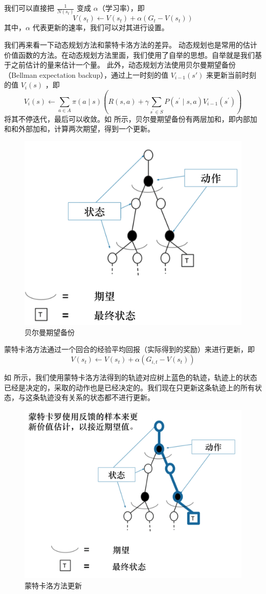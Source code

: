我们可以直接把 $\frac{1}{N(s_t)}$ 变成 $\alpha$（学习率），即
\begin{equation}
	V\left(s_{t}\right) \leftarrow V\left(s_{t}\right)+\alpha\left(G_{t}-V\left(s_{t}\right)\right)
\end{equation}
其中，$\alpha$ 代表更新的速率，我们可以对其进行设置。

我们再来看一下动态规划方法和蒙特卡洛方法的差异。
动态规划也是常用的估计价值函数的方法。在动态规划方法里面，我们使用了自举的思想。自举就是我们基于之前估计的量来估计一个量。
此外，动态规划方法使用贝尔曼期望备份（Bellman expectation backup），通过上一时刻的值 $V_{i-1}(s')$ 来更新当前时刻的值 $V_i(s)$ ，即
	\begin{equation}
		\label{eq:}
		V_{i}(s) \leftarrow \sum_{a \in A} \pi(a \mid s)\left(R(s, a)+\gamma \sum_{s^{\prime} \in S} P\left(s^{\prime} \mid s, a\right) V_{i-1}\left(s^{\prime}\right)\right)
	\end{equation}
将其不停迭代，最后可以收敛。如 所示，贝尔曼期望备份有两层加和，即内部加和和外部加和，计算两次期望，得到一个更新。
\begin{figure}[htb]
	\centering
	\includegraphics[width=0.3\linewidth]{res/ch3/MC_4}
	\caption{贝尔曼期望备份}
	\label{fig:MC_4}
\end{figure}


蒙特卡洛方法通过一个回合的经验平均回报（实际得到的奖励）来进行更新，即
\begin{equation}
	V\left(s_{t}\right) \leftarrow V\left(s_{t}\right)+\alpha\left(G_{i, t}-V\left(s_{t}\right)\right)
\end{equation}

如 所示，我们使用蒙特卡洛方法得到的轨迹对应树上蓝色的轨迹，轨迹上的状态已经是决定的，采取的动作也是已经决定的。我们现在只更新这条轨迹上的所有状态，与这条轨迹没有关系的状态都不进行更新。

\begin{figure}[htb]
	\centering
	\includegraphics[width=0.4\linewidth]{res/ch3/MC_5}
	\caption{蒙特卡洛方法更新}
	\label{fig:MC_5}
\end{figure}

